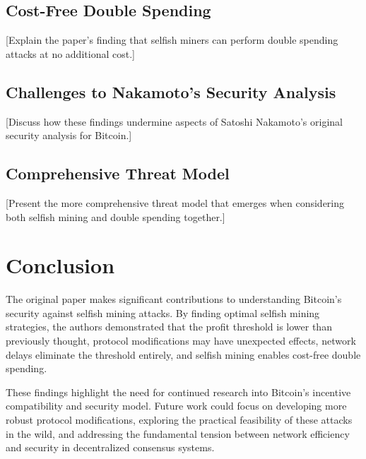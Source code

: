 \documentclass[conference]{IEEEtran}
\begin{document}
\subsection{Cost-Free Double Spending}

[Explain the paper's finding that selfish miners can perform double spending attacks at no additional cost.]

\subsection{Challenges to Nakamoto's Security Analysis}

[Discuss how these findings undermine aspects of Satoshi Nakamoto's original security analysis for Bitcoin.]

\subsection{Comprehensive Threat Model}

[Present the more comprehensive threat model that emerges when considering both selfish mining and double spending together.]

\section{Conclusion}

The original paper makes significant contributions to understanding Bitcoin's security against selfish mining attacks. By finding optimal selfish mining strategies, the authors demonstrated that the profit threshold is lower than previously thought, protocol modifications may have unexpected effects, network delays eliminate the threshold entirely, and selfish mining enables cost-free double spending.

These findings highlight the need for continued research into Bitcoin's incentive compatibility and security model. Future work could focus on developing more robust protocol modifications, exploring the practical feasibility of these attacks in the wild, and addressing the fundamental tension between network efficiency and security in decentralized consensus systems.



\end{document}
